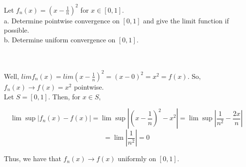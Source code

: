 Let $f_n(x)=(x-\frac1n)^2$ for $x\in[0,1]$.\\

a. Determine pointwise convergence on $[0,1]$ and give the limit function if possible.\\

b. Determine uniform convergence on $[0,1]$.\\\\

\begin{solution}\renewcommand{\qedsymbol}{}\ \\
    Well, $limf_n(x)=lim(x-\frac1n)^2=(x-0)^2=x^2=f(x)$. So, $f_n(x)\rightarrow f(x)=x^2$ pointwise.\\

    Let $S=[0,1]$. Then, for $x\in S$,
    
    $$\lim\sup|f_n(x)-f(x)|=\lim\sup|(x-\frac1n)^2-x^2|=\lim\sup|\frac{1}{n^2}-\frac{2x}{n}|$$
    $$=\lim|\frac{1}{n^2}|=0$$
    
    Thus, we have that $f_n(x)\rightarrow f(x)$ uniformly on $[0,1]$.

\end{solution}